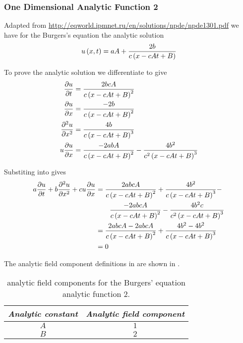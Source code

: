 \subsubsection{One Dimensional Analytic Function 2}

Adapted from \url{http://eqworld.ipmnet.ru/en/solutions/npde/npde1301.pdf} we
have for the \oned Burgers's equation the analytic solution
\begin{equation}
  \fnof{u}{x,t}=aA+\dfrac{2b}{c\pbrac{x-cAt+B}}
  \label{eqn:AnalyticBurgersEquationOneDim2}
\end{equation}

To prove the analytic solution we differentiate  to give
\begin{align}
  \delby{u}{t} &= \dfrac{2bcA}{c\pbrac{x-cAt+B}^{2}} \\
  \delby{u}{x} &= \dfrac{-2b}{c\pbrac{x-cAt+B}^{2}} \\
  \deltwosqby{u}{x} &= \dfrac{4b}{c\pbrac{x-cAt+B}^{3}} \\
  u\delby{u}{x} &= \dfrac{-2abA}{c\pbrac{x-cAt+B}^{2}} - \dfrac{4b^{2}}{c^{2}\pbrac{x-cAt+B}^{3}}  \\
  \label{eqn:AnalyticBurgersEquationOneDim2Derivatives}
\end{align}

Substiting  into  gives
\begin{align}
  a \dfrac{\partial u}{\partial t} +b \dfrac{\partial^{2} u}{\partial {x}^{2}} +cu \dfrac{\partial u}{\partial x}  &=
  \dfrac{2abcA}{c\left( x-cAt+B \right)^{2}}+\dfrac{4b^{2}}{c\left( x-cAt+B \right)^{3}}- \\
  & \qquad \dfrac{-2abcA}{c\left( x-cAt+B \right)^{2}}-\dfrac{4b^{2}c}{c^{2}\left( x-cAt+B \right)^{3}} \\
  &=\dfrac{2abcA-2abcA}{c\left( x-cAt+B \right)^{2}}+\dfrac{4b^{2}-4b^{2}}{c\left( x-cAt+B \right)^{3}}\\
  &= 0
\end{align}

The analytic field component definitions in \OpenCMISS are shown in .

\begin{table}[htb] \centering
  \begin{tabular}{|c|c|} \hline
    \emph{Analytic constant} & \emph{Analytic field component} \\ \hline \hline
    $A$ & $1$ \\ 
    $B$ & $2$ \\  \hline
  \end{tabular}
  \caption{\OpenCMISS analytic field components for the \oned Burgers' equation
    analytic function 2.}
  \label{tab:OpenCMISSAnalyticFieldBurgersEquationOneDim2}
\end{table}

